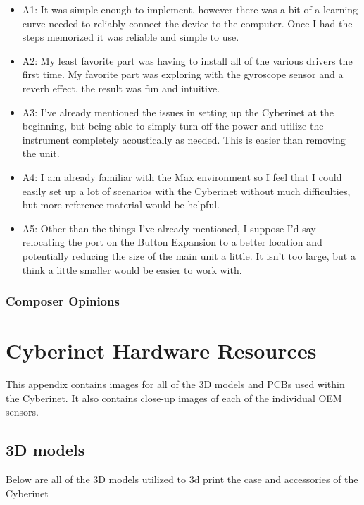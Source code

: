 \begin{itemize}
    \item A1: It was simple enough to implement, however there was a bit of a learning curve needed to reliably connect the device to the computer. Once I had the steps memorized it was reliable and simple to use.
    \item A2: My least favorite part was having to install all of the various drivers the first time. My favorite part was exploring with the gyroscope sensor and a reverb effect. the result was fun and intuitive.
    \item A3: I've already mentioned the issues in setting up the Cyberinet at the beginning, but being able to simply turn off the power and utilize the instrument completely acoustically as needed. This is easier than removing the unit.
    \item A4: I am already familiar with the Max environment so I feel that I could easily set up a lot of scenarios with the Cyberinet without much difficulties, but more reference material would be helpful. 
    \item A5: Other than the things I've already mentioned, I suppose I'd say relocating the port on the Button Expansion to a better location and potentially reducing the size of the main unit a little. It isn't too large, but a think a little smaller would be easier to work with.
\end{itemize}

\subsection{Composer Opinions}

\appendix

\chapter{Cyberinet Hardware Resources}
This appendix contains images for all of the 3D models and PCBs used within the Cyberinet. It also contains close-up images of each of the individual OEM sensors.

\section{3D models}
Below are all of the 3D models utilized to 3d print the case and accessories of the Cyberinet

